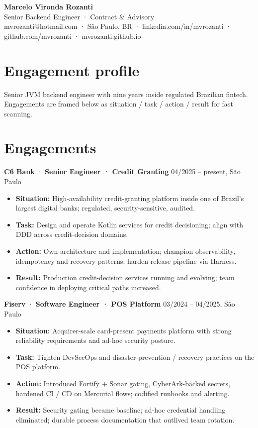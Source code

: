 \documentclass[10pt,a4paper]{article}
\newcommand{\engagement}[3]{\noindent\textbf{#1} \textcolor{accent}{·} \textbf{#2} \hfill \textcolor{muted}{#3}\par\smallskip}
\begin{document}
\begin{center}
{\Huge\bfseries Marcelo Vironda Rozanti}\\[2pt]
{\large\color{accent} Senior Backend Engineer · Contract \& Advisory}\\[3pt]
{\small mvrozanti@hotmail.com · São Paulo, BR · linkedin.com/in/mvrozanti · github.com/mvrozanti · mvrozanti.github.io}
\end{center}

\section{Engagement profile}
\small
Senior JVM backend engineer with nine years inside regulated Brazilian fintech. Engagements are framed below as situation / task / action / result for fast scanning.

\section{Engagements}

\engagement{C6 Bank}{Senior Engineer · Credit Granting}{04/2025 -- present, São Paulo}
\begin{itemize}
\item \textbf{Situation:} High-availability credit-granting platform inside one of Brazil's largest digital banks; regulated, security-sensitive, audited.
\item \textbf{Task:} Design and operate Kotlin services for credit decisioning; align with DDD across credit-decision domains.
\item \textbf{Action:} Own architecture and implementation; champion observability, idempotency and recovery patterns; harden release pipeline via Harness.
\item \textbf{Result:} Production credit-decision services running and evolving; team confidence in deploying critical paths increased.
\end{itemize}\medskip

\engagement{Fiserv}{Software Engineer · POS Platform}{03/2024 -- 04/2025, São Paulo}
\begin{itemize}
\item \textbf{Situation:} Acquirer-scale card-present payments platform with strong reliability requirements and ad-hoc security posture.
\item \textbf{Task:} Tighten DevSecOps and disaster-prevention / recovery practices on the POS platform.
\item \textbf{Action:} Introduced Fortify + Sonar gating, CyberArk-backed secrets, hardened CI / CD on Mercurial flows; codified runbooks and alerting.
\item \textbf{Result:} Security gating became baseline; ad-hoc credential handling eliminated; durable process documentation that outlived team rotation.
\end{itemize}\medskip
\end{document}
